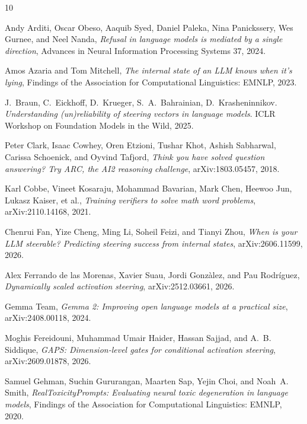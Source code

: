 \providecommand{\bysame}{\leavevmode\hbox to3em{\hrulefill}\thinspace}
\begin{thebibliography}{10}

Andy Arditi, Oscar Obeso, Aaquib Syed, Daniel Paleka, Nina Panickssery, Wes
  Gurnee, and Neel Nanda, \emph{Refusal in language models is mediated by a
  single direction}, Advances in Neural Information Processing Systems 37, 2024.

Amos Azaria and Tom Mitchell, \emph{The internal state of an LLM knows when it's
  lying}, Findings of the Association for Computational Linguistics: EMNLP, 2023.

J.~Braun, C.~Eickhoff, D.~Krueger, S.~A.~Bahrainian, D.~Krasheninnikov.
  \emph{Understanding (un)reliability of steering vectors in language models}.
  ICLR Workshop on Foundation Models in the Wild, 2025.

Peter Clark, Isaac Cowhey, Oren Etzioni, Tushar Khot, Ashish Sabharwal, Carissa
  Schoenick, and Oyvind Tafjord, \emph{Think you have solved question answering?
  Try ARC, the AI2 reasoning challenge}, arXiv:1803.05457, 2018.

Karl Cobbe, Vineet Kosaraju, Mohammad Bavarian, Mark Chen, Heewoo Jun, Lukasz
  Kaiser, et al., \emph{Training verifiers to solve math word problems},
  arXiv:2110.14168, 2021.

Chenrui Fan, Yize Cheng, Ming Li, Soheil Feizi, and Tianyi Zhou, \emph{When is
  your LLM steerable? Predicting steering success from internal states},
  arXiv:2606.11599, 2026.

Alex Ferrando de las Morenas, Xavier Suau, Jordi Gonz\`alez, and Pau
  Rodr\'iguez, \emph{Dynamically scaled activation steering}, arXiv:2512.03661,
  2026.

Gemma Team, \emph{Gemma 2: Improving open language models at a practical size},
  arXiv:2408.00118, 2024.

Moghis Fereidouni, Muhammad Umair Haider, Hassan Sajjad, and A.~B. Siddique,
  \emph{GAPS: Dimension-level gates for conditional activation steering},
  arXiv:2609.01878, 2026.

Samuel Gehman, Suchin Gururangan, Maarten Sap, Yejin Choi, and Noah~A. Smith,
  \emph{RealToxicityPrompts: Evaluating neural toxic degeneration in language
  models}, Findings of the Association for Computational Linguistics: EMNLP, 2020.


\end{thebibliography}
